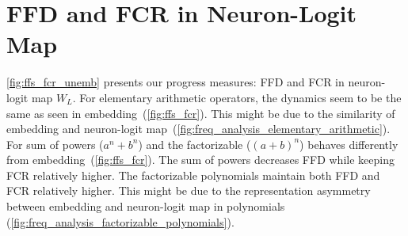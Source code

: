 



%

\clearpage
\section{FFD and FCR in Neuron-Logit Map}
\label{appendix:details_progress_measure}
\autoref{fig:ffs_fcr_unemb} presents our progress measures: FFD and FCR in neuron-logit map $W_{L}$.
For elementary arithmetic operators, the dynamics seem to be the same as seen in embedding~(\autoref{fig:ffs_fcr}). This might be due to the similarity of embedding and neuron-logit map~(\autoref{fig:freq_analysis_elementary_arithmetic}).
For sum of powers ($a^n+b^n$) and the factorizable ($(a+b)^n$) behaves differently from embedding~(\autoref{fig:ffs_fcr}).
The sum of powers decreases FFD while keeping FCR relatively higher.
The factorizable polynomials maintain both FFD and FCR relatively higher.
This might be due to the representation asymmetry between embedding and neuron-logit map in polynomials (\autoref{fig:freq_analysis_factorizable_polynomials}).

